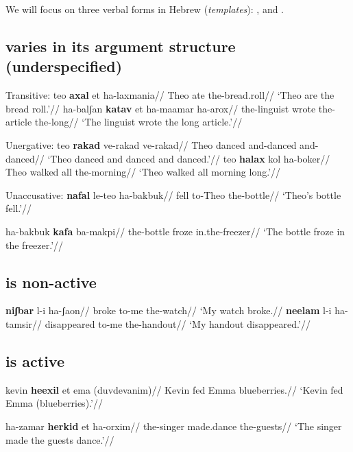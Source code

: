 We will focus on three verbal forms in Hebrew (\emph{templates}): {\tkal}, {\tnif} and {\thif}.

	\subsection{{\tkal} varies in its argument structure (underspecified)}
\pex Transitive:
	\a \begingl
		\gla teo \textbf{axal} et ha-laxmania//
		\glb Theo ate  the-bread.roll//
		\glft `Theo are the bread roll.'//
	\endgl
	\a \begingl
		\gla ha-balʃan \textbf{katav} et ha-maamar ha-arox//
		\glb the-linguist wrote  the-article the-long//
		\glft `The linguist wrote the long article.'//
	\endgl
\xe

\pex Unergative:
	\a \begingl
		\gla teo \textbf{rakad} ve-rakad ve-rakad//
		\glb Theo danced and-danced and-danced//
		\glft `Theo danced and danced and danced.'//
	\endgl
	\a \begingl
		\gla teo \textbf{halax} kol ha-boker//
		\glb Theo walked all the-morning//
		\glft `Theo walked all morning long.'//
	\endgl
\xe

\pex Unaccusative:
	\a \begingl
		\gla \textbf{nafal} le-teo ha-bakbuk//
		\glb fell to-Theo the-bottle//
		\glft `Theo's bottle fell.'//
	\endgl
	
	\a \begingl
		\gla ha-bakbuk \textbf{kafa} ba-makpi//
		\glb the-bottle froze in.the-freezer//
		\glft `The bottle froze in the freezer.'//
	\endgl
\xe


	\subsection{{\tnif} is non-active}
\pex
	\a \begingl
		\gla \textbf{niʃbar} l-i ha-ʃaon//
		\glb broke to-me the-watch//
		\glft `My watch broke.//
	\endgl
	\a \begingl
		\gla \textbf{neelam} l-i ha-tamsir//
		\glb disappeared to-me the-handout//
		\glft `My handout disappeared.'//
	\endgl
\xe

	\subsection{{\thif} is active}
\pex
	\a \begingl
		\gla kevin \textbf{heexil} et ema (duvdevanim)//
		\glb Kevin fed  Emma blueberries.//
		\glft `Kevin fed Emma (blueberries).'//
	\endgl %
		
	\a \begingl
		\gla ha-zamar \textbf{herkid} et ha-orxim//
		\glb the-singer made.dance  the-guests//
		\glft `The singer made the guests dance.'//
	\endgl
\xe

